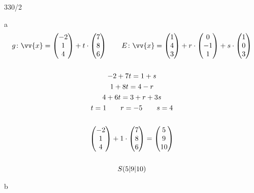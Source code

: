\begin{exercise}{330/2}
  \item [a]
  \begin{gather*}
    g \colon \vv{x} = \begin{pmatrix}-2 \\ 1 \\ 4\end{pmatrix} + t \cdot \begin{pmatrix}7 \\ 8 \\ 6\end{pmatrix} \qquad E \colon \vv{x} = \begin{pmatrix}1 \\ 4 \\ 3\end{pmatrix} + r \cdot \begin{pmatrix}0 \\ -1 \\ 1\end{pmatrix} + s \cdot \begin{pmatrix}1 \\ 0 \\ 3\end{pmatrix} \\\\
    -2 + 7t = 1 + s \\
    1 + 8t = 4 - r \\
    4 + 6t = 3 + r + 3s \\
    t = 1 \qquad r = -5 \qquad s = 4 \\\\
    \begin{pmatrix}-2 \\ 1 \\ 4\end{pmatrix} + 1 \cdot \begin{pmatrix}7 \\ 8 \\ 6\end{pmatrix} = \begin{pmatrix}5 \\ 9 \\ 10\end{pmatrix} \\\\
    S(5|9|10)
  \end{gather*}
  \item [b]
  \begin{gather*}

\end{gather*}
\end{exercise}
